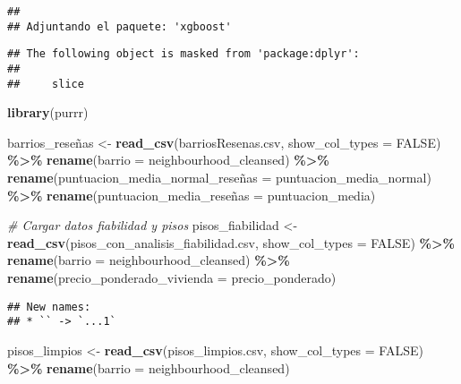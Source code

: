 \documentclass[
]{article}
\newenvironment{Shaded}{\begin{snugshade}}{\end{snugshade}}
\newcommand{\AttributeTok}[1]{\textcolor[rgb]{0.13,0.29,0.53}{#1}}
\newcommand{\CommentTok}[1]{\textcolor[rgb]{0.56,0.35,0.01}{\textit{#1}}}
\newcommand{\ConstantTok}[1]{\textcolor[rgb]{0.56,0.35,0.01}{#1}}
\newcommand{\FunctionTok}[1]{\textcolor[rgb]{0.13,0.29,0.53}{\textbf{#1}}}
\newcommand{\NormalTok}[1]{#1}
\newcommand{\OtherTok}[1]{\textcolor[rgb]{0.56,0.35,0.01}{#1}}
\newcommand{\SpecialCharTok}[1]{\textcolor[rgb]{0.81,0.36,0.00}{\textbf{#1}}}
\newcommand{\StringTok}[1]{\textcolor[rgb]{0.31,0.60,0.02}{#1}}
\begin{document}
\begin{verbatim}
## 
## Adjuntando el paquete: 'xgboost'
\end{verbatim}

\begin{verbatim}
## The following object is masked from 'package:dplyr':
## 
##     slice
\end{verbatim}

\begin{Shaded}
\begin{Highlighting}[]
\FunctionTok{library}\NormalTok{(purrr)}
\end{Highlighting}
\end{Shaded}

\begin{Shaded}
\begin{Highlighting}[]
\NormalTok{barrios\_reseñas }\OtherTok{\textless{}{-}} \FunctionTok{read\_csv}\NormalTok{(}\StringTok{\textquotesingle{}barriosResenas.csv\textquotesingle{}}\NormalTok{, }\AttributeTok{show\_col\_types =} \ConstantTok{FALSE}\NormalTok{) }\SpecialCharTok{\%\textgreater{}\%}  
  \FunctionTok{rename}\NormalTok{(}\AttributeTok{barrio =}\NormalTok{ neighbourhood\_cleansed) }\SpecialCharTok{\%\textgreater{}\%}
  \FunctionTok{rename}\NormalTok{(puntuacion\_media\_normal\_reseñas }\OtherTok{=}\NormalTok{ puntuacion\_media\_normal) }\SpecialCharTok{\%\textgreater{}\%}
  \FunctionTok{rename}\NormalTok{(puntuacion\_media\_reseñas }\OtherTok{=}\NormalTok{ puntuacion\_media)}
  
\CommentTok{\# Cargar datos fiabilidad y pisos}
\NormalTok{pisos\_fiabilidad }\OtherTok{\textless{}{-}} \FunctionTok{read\_csv}\NormalTok{(}\StringTok{\textquotesingle{}pisos\_con\_analisis\_fiabilidad.csv\textquotesingle{}}\NormalTok{, }\AttributeTok{show\_col\_types =} \ConstantTok{FALSE}\NormalTok{) }\SpecialCharTok{\%\textgreater{}\%}
  \FunctionTok{rename}\NormalTok{(}\AttributeTok{barrio =}\NormalTok{ neighbourhood\_cleansed) }\SpecialCharTok{\%\textgreater{}\%}
  \FunctionTok{rename}\NormalTok{(}\AttributeTok{precio\_ponderado\_vivienda =}\NormalTok{ precio\_ponderado)}
\end{Highlighting}
\end{Shaded}

\begin{verbatim}
## New names:
## * `` -> `...1`
\end{verbatim}

\begin{Shaded}
\begin{Highlighting}[]
\NormalTok{pisos\_limpios }\OtherTok{\textless{}{-}} \FunctionTok{read\_csv}\NormalTok{(}\StringTok{\textquotesingle{}pisos\_limpios.csv\textquotesingle{}}\NormalTok{, }\AttributeTok{show\_col\_types =} \ConstantTok{FALSE}\NormalTok{) }\SpecialCharTok{\%\textgreater{}\%}
  \FunctionTok{rename}\NormalTok{(}\AttributeTok{barrio =}\NormalTok{ neighbourhood\_cleansed) }
\end{Highlighting}
\end{Shaded}
\end{document}
